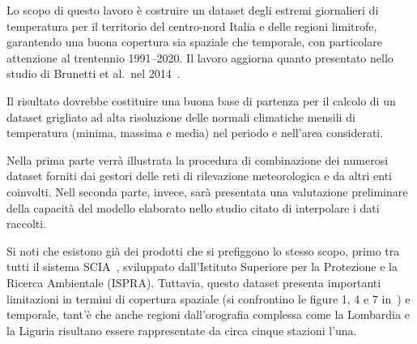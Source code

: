 Lo scopo di questo lavoro è costruire un dataset degli estremi giornalieri di temperatura per il territorio del centro-nord Italia e delle regioni limitrofe, garantendo una buona copertura sia spaziale che temporale, con particolare attenzione al trentennio 1991--2020. Il lavoro aggiorna quanto presentato nello studio di Brunetti et al.\ nel 2014~\cite{brunettiHighresolutionTemperatureClimatology2014}.

Il risultato dovrebbe costituire una buona base di partenza per il calcolo di un dataset grigliato ad alta risoluzione delle normali climatiche mensili di temperatura (minima, massima e media) nel periodo e nell'area considerati.

Nella prima parte verrà illustrata la procedura di combinazione dei numerosi dataset forniti dai gestori delle reti di rilevazione meteorologica e da altri enti coinvolti. Nell seconda parte, invece, sarà presentata una valutazione preliminare della capacità del modello elaborato nello studio citato di interpolare i dati raccolti.

Si noti che esistono già dei prodotti che si prefiggono lo stesso scopo, primo tra tutti il sistema SCIA~\cite{climnormISPRA2022}, sviluppato dall'Istituto Superiore per la Protezione e la Ricerca Ambientale (ISPRA). Tuttavia, questo dataset presenta importanti limitazioni in termini di copertura spaziale (si confrontino le figure 1, 4 e 7 in~\cite[pp.~12--15]{climnormISPRA2022}) e temporale, tant'è che anche regioni dall'orografia complessa come la Lombardia e la Liguria risultano essere rappresentate da circa cinque stazioni l'una.
